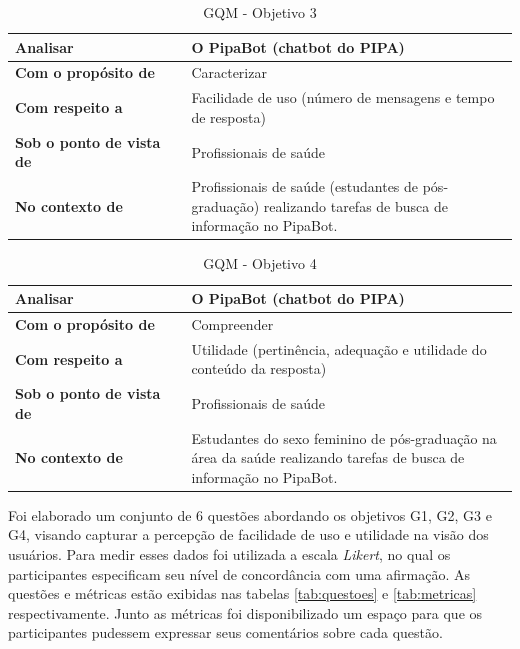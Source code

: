 	\begin{center}
		\begin{table}[h!]
			\begin{tabular}{ | m{0.35\linewidth} | m{0.65\linewidth} | } 
				\hline
				\textbf{Analisar} & O PipaBot (chatbot do PIPA) \\ 
				\hline
				\textbf{Com o propósito de} & Caracterizar \\ 
				\hline
				\textbf{Com respeito a} & Facilidade de uso (número de mensagens e tempo de resposta) \\ 
				\hline
				\textbf{Sob o ponto de vista de} & Profissionais de saúde \\
				\hline
				\textbf{No contexto de} & Profissionais de saúde (estudantes de pós-graduação) realizando tarefas de busca de informação no PipaBot. \\
				\hline
			\end{tabular}
			\caption{GQM - Objetivo 3}
			\label{tab:obj3}
		\end{table}
	\end{center}

	\begin{center}
		\begin{table}[h!]
			\begin{tabular}{ | m{0.35\linewidth} | m{0.65\linewidth} | } 
				\hline
				\textbf{Analisar} & O PipaBot (chatbot do PIPA) \\ 
				\hline
				\textbf{Com o propósito de} & Compreender \\ 
				\hline
				\textbf{Com respeito a} & Utilidade (pertinência, adequação e utilidade do conteúdo da resposta) \\ 
				\hline
				\textbf{Sob o ponto de vista de} & Profissionais de saúde \\
				\hline
				\textbf{No contexto de} & Estudantes do sexo feminino de pós-graduação na área da saúde realizando tarefas de busca de informação no PipaBot. \\
				\hline
			\end{tabular}
			\caption{GQM - Objetivo 4}
			\label{tab:obj4}
		\end{table}
	\end{center}

	Foi elaborado um conjunto de 6 questões abordando os objetivos G1, G2, G3 e G4, visando capturar a percepção de facilidade de uso e utilidade na visão dos usuários. Para medir esses dados foi utilizada a escala \textit{Likert}, no qual os participantes especificam seu nível de concordância com uma afirmação. As questões e métricas estão exibidas nas tabelas \ref{tab:questoes} e \ref{tab:metricas} respectivamente. Junto as métricas foi disponibilizado um espaço para que os participantes pudessem expressar seus comentários sobre cada questão.
	
